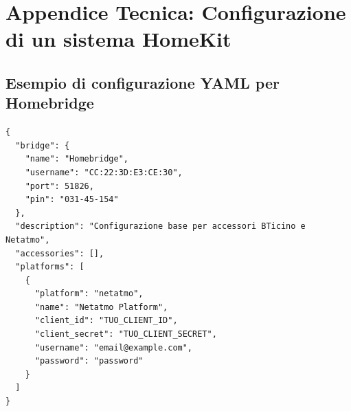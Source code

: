 \chapter{Appendice Tecnica: Configurazione di un sistema HomeKit}
\section*{Esempio di configurazione YAML per Homebridge}
\begin{verbatim}
{
  "bridge": {
    "name": "Homebridge",
    "username": "CC:22:3D:E3:CE:30",
    "port": 51826,
    "pin": "031-45-154"
  },
  "description": "Configurazione base per accessori BTicino e Netatmo",
  "accessories": [],
  "platforms": [
    {
      "platform": "netatmo",
      "name": "Netatmo Platform",
      "client_id": "TUO_CLIENT_ID",
      "client_secret": "TUO_CLIENT_SECRET",
      "username": "email@example.com",
      "password": "password"
    }
  ]
}
\end{verbatim}


